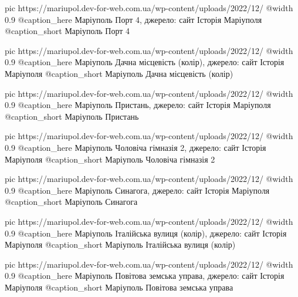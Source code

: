   pic https://mariupol.dev-for-web.com.ua/wp-content/uploads/2022/12/%
  @width 0.9
  @caption_here Маріуполь Порт 4, джерело: сайт Історія Маріуполя
  @caption_short Маріуполь Порт 4

  pic https://mariupol.dev-for-web.com.ua/wp-content/uploads/2022/12/%
  @width 0.9
  @caption_here Маріуполь Дачна місцевість (колір), джерело: сайт Історія Маріуполя
  @caption_short Маріуполь Дачна місцевість (колір)

  pic https://mariupol.dev-for-web.com.ua/wp-content/uploads/2022/12/%
  @width 0.9
  @caption_here Маріуполь Пристань, джерело: сайт Історія Маріуполя
  @caption_short Маріуполь Пристань

  pic https://mariupol.dev-for-web.com.ua/wp-content/uploads/2022/12/%
  @width 0.9
  @caption_here Маріуполь Чоловіча гімназія 2, джерело: сайт Історія Маріуполя
  @caption_short Маріуполь Чоловіча гімназія 2

  pic https://mariupol.dev-for-web.com.ua/wp-content/uploads/2022/12/%
  @width 0.9
  @caption_here Маріуполь Синагога, джерело: сайт Історія Маріуполя
  @caption_short Маріуполь Синагога

  pic https://mariupol.dev-for-web.com.ua/wp-content/uploads/2022/12/%
  @width 0.9
  @caption_here Маріуполь Італійська вулиця (колір), джерело: сайт Історія Маріуполя
  @caption_short Маріуполь Італійська вулиця (колір)

  pic https://mariupol.dev-for-web.com.ua/wp-content/uploads/2022/12/%
  @width 0.9
  @caption_here Маріуполь Повітова земська управа, джерело: сайт Історія Маріуполя
  @caption_short Маріуполь Повітова земська управа

